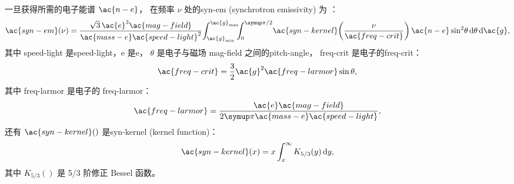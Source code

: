 一旦获得所需的电子能谱 $\ac{n-e}$，
在频率 $\nu$ 处的\acl{syn-em} (synchrotron emissivity) 为 \cite{rybicki1979}：
\begin{equation}
  \label{sec:jnu-sync}
  \ac{syn-em}(\nu) =
    \frac{\sqrt{3} \,\ac{e}^3 \ac{mag-field}}{\ac{mass-e}\ac{speed-light}^2}
    \!\int_{\ac{g}_{\R{min}}}^{\ac{g}_{\R{max}}}
    \!\!\!\int_0^{\Cpi/2}
    \! \ac{syn-kernel}\!\left( \frac{\nu}{\ac{freq-crit}} \right)
    \ac{n-e} \sin^2 \!\theta \,\D{\theta} \,\D{\ac{g}} ,
\end{equation}
其中
\ac{speed-light} 是\acl{speed-light}，\ac{e} 是\acl{e}，
$\theta$ 是电子与磁场 \ac{mag-field} 之间的\ac{pitch-angle}，
\ac{freq-crit} 是电子的\acl{freq-crit}：
\begin{equation}
  \ac{freq-crit} = \frac{3}{2} \ac{g}^2 \ac{freq-larmor} \sin\theta ,
\end{equation}
其中 \ac{freq-larmor} 是电子的 \acl{freq-larmor}：
\begin{equation}
  \ac{freq-larmor} =
    \frac{\ac{e}\ac{mag-field}}{2\Cpi \ac{mass-e}\ac{speed-light}} ,
\end{equation}
还有 $\ac{syn-kernel}()$ 是\acl{syn-kernel} (kernel function)：
\begin{equation}
  \ac{syn-kernel}(x) = x \int_x^{\infty} K_{5/3}(y) \,\D{y} ,
\end{equation}
其中 $K_{5/3}()$ 是 5/3 阶修正 Bessel 函数。

